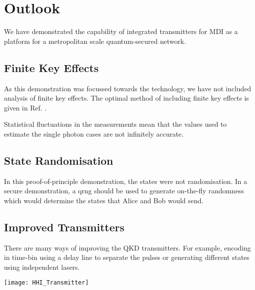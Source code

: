 \section{Outlook}

We have demonstrated the capability of integrated transmitters for \acl{MDI} as a platform for a metropolitan scale quantum-secured network. 

\subsection{Finite Key Effects}

As this demonstration was focussed towards the technology, we have not included analysis of finite key effects. The optimal method of including finite key effects is given in Ref. \cite{zhou2016}.

Statistical fluctuations in the measurements mean that the values used to estimate the single photon cases are not infinitely accurate. 

\subsection{State Randomisation}

In this proof-of-principle demonstration, the states were not randomisation. In a secure demonstration, a \ac{qrng} should be used to generate on-the-fly randomness which would determine the states that Alice and Bob would send. 

\subsection{Improved Transmitters}

There are many ways of improving the QKD transmitters. For example, encoding in time-bin using a delay line to separate the pulses or generating different states using independent lasers.

\begin{sidewaysfigure}
	\centering
	\texttt{[image: HHI\_Transmitter]}
	\caption[Latest generation InP QKD Transmitter]{Latest generation HHI indium phosphide transmitter. The \SI[product-units=power]{6x4}{mm} chip contains a few ways to create BB84 states for QKD. Firstly, we have designs to compare \ac{dfb} and \ac{DBR} lasers. Secondly, we can use a delay line to separate the time bins. Finally, we have multiplexed lasers to pulse independently lasers for each state.}
\end{sidewaysfigure}

